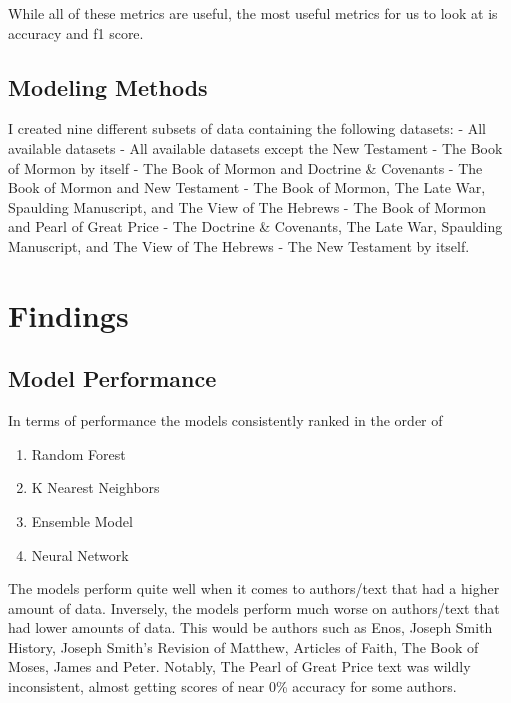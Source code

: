\documentclass[
  letterpaper,
  DIV=11,
  numbers=noendperiod]{scrartcl}
\providecommand{\tightlist}{%
  \setlength{\itemsep}{0pt}\setlength{\parskip}{0pt}}\usepackage{longtable,booktabs,array}
\begin{document}
While all of these metrics are useful, the most useful metrics for us to
look at is accuracy and f1 score.

\hypertarget{modeling-methods}{%
\subsection{Modeling Methods}\label{modeling-methods}}

I created nine different subsets of data containing the following
datasets: - All available datasets - All available datasets except the
New Testament - The Book of Mormon by itself - The Book of Mormon and
Doctrine \& Covenants - The Book of Mormon and New Testament - The Book
of Mormon, The Late War, Spaulding Manuscript, and The View of The
Hebrews - The Book of Mormon and Pearl of Great Price - The Doctrine \&
Covenants, The Late War, Spaulding Manuscript, and The View of The
Hebrews - The New Testament by itself.

\hypertarget{findings}{%
\section{Findings}\label{findings}}

\hypertarget{model-performance}{%
\subsection{\texorpdfstring{\textbf{Model
Performance}}{Model Performance}}\label{model-performance}}

In terms of performance the models consistently ranked in the order of

\begin{enumerate}
\def\labelenumi{\arabic{enumi}.}
\tightlist
\item
  Random Forest
\item
  K Nearest Neighbors
\item
  Ensemble Model
\item
  Neural Network
\end{enumerate}

The models perform quite well when it comes to authors/text that had a
higher amount of data. Inversely, the models perform much worse on
authors/text that had lower amounts of data. This would be authors such
as Enos, Joseph Smith History, Joseph Smith's Revision of Matthew,
Articles of Faith, The Book of Moses, James and Peter. Notably, The
Pearl of Great Price text was wildly inconsistent, almost getting scores
of near 0\% accuracy for some authors.
\end{document}

